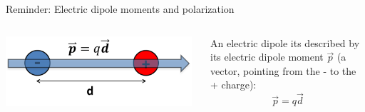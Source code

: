 {
\reminderslide

%
%
%

\begin{frame}{Reminder: Electric dipole moments and polarization}

\begin{columns}
  \begin{column}{0.50\textwidth}
    \begin{center}
      \includegraphics[width=0.98\textwidth]{./images/schematics/electric_dipole_moment_01.png}\\
    \end{center}
  \end{column}
  \begin{column}{0.50\textwidth}
   An electric dipole its described by its electric dipole moment $\vec{p}$
   (a vector, pointing from the - to the + charge):
   \begin{equation*}
     \vec{p} = q \vec{d}
   \end{equation*}
  \end{column}
\end{columns}


\end{frame}}
